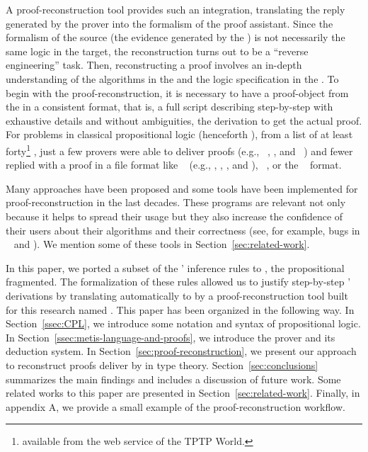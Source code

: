 \documentclass[../main.tex]{subfiles}
\begin{document}
A proof-reconstruction tool provides such an integration, translating
the reply generated by the prover into the formalism of the proof
assistant. Since the formalism of the source (the evidence
generated by the \ATP) is not necessarily the same logic in the
target, the reconstruction turns out to be a ``reverse engineering''
task. Then, reconstructing a proof involves an in-depth
understanding of the algorithms in the \ATP and the logic specification
in the \ITP. To begin with the proof-reconstruction, it is
necessary to have a proof-object from the \ATP in a consistent
format, that is, a full script describing step-by-step
with exhaustive details and without ambiguities, the derivation to
get the actual proof.
For problems in classical propositional logic (henceforth \CPL),
from a list of at least forty\footnote{\ATPs available from the web
service  of the TPTP World.} \ATPs, just a few
provers were able to deliver proofs (e.g.,
~\cite{Barrett2011}, , and
~\cite{hillenbrand1997}) and fewer replied with
a proof
in a file format like \TSTP~\cite{Sutcliffe-Schulz-Claessen-VanGelder-2006}
(e.g., , \Metis, , and ),
~\cite{Stump2008}, or the ~\cite{Bohme2011} format.

Many approaches have been proposed and some tools have been
implemented for proof-reconstruction in the last decades. These
programs are relevant not only because it helps to spread their
usage but they also increase the confidence of their users about
their algorithms and their correctness (see, for example, bugs in
\ATPs~\cite{Keller2013,Bohme2011,Fleury2014} and
\cite{Kanso2012}).
We mention some of these tools in Section~\ref{sec:related-work}.

In this paper, we ported a subset of the \Metis' inference rules to
\Agda, the propositional fragmented. The formalization of
these rules allowed us to justify step-by-step \Metis' \TSTP derivations by
translating automatically to \Agda by a proof-reconstruction tool built for
this research named \Athena.
This paper has been organized in the following way.
In Section~\ref{ssec:CPL}, we introduce some
notation and syntax of propositional logic.
In Section~\ref{ssec:metis-language-and-proofs}, we introduce the
\Metis prover and its deduction system.
In Section~\ref{sec:proof-reconstruction}, we present our
approach to reconstruct proofs deliver by \Metis in type theory.
Section~\ref{sec:conclusions} summarizes the main findings and includes a
discussion of future work.
Some related works to this paper are presented in Section~\ref{sec:related-work}.
Finally, in appendix \textsc{A}, we provide a small example of the
proof-reconstruction workflow.
\end{document}
